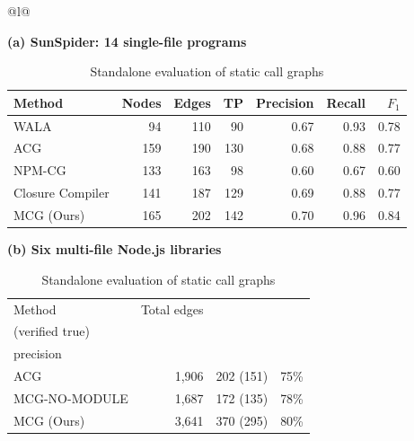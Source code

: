 \begin{table}[!htbp]
\centering
\caption{Standalone evaluation of static call graphs}
\label{tab:mcg_static}
\small
\setlength{\tabcolsep}{4.3pt}
\renewcommand{\arraystretch}{1.10}
\begin{tabular*}{\linewidth}{@{}l@{}}
\begin{minipage}{\linewidth}
\textbf{(a) SunSpider: 14 single-file programs}\par\smallskip
\begin{tabular*}{1.0\linewidth}{@{\extracolsep{\fill}}lrrrrrr@{}}
\toprule
Method & Nodes & Edges & TP & Precision & Recall & $F_1$ \\
\midrule
WALA & 94 & 110 & 90 & 0.67 & 0.93 & 0.78 \\
ACG & 159 & 190 & 130 & 0.68 & 0.88 & 0.77 \\
NPM-CG & 133 & 163 & 98 & 0.60 & 0.67 & 0.60 \\
Closure Compiler & 141 & 187 & 129 & 0.69 & 0.88 & 0.77 \\
MCG (Ours) & 165 & 202 & 142 & 0.70 & 0.96 & 0.84 \\
\bottomrule
\end{tabular*}\par\medskip
\textbf{(b) Six multi-file Node.js libraries}\par\smallskip
\begin{tabular*}{1.0\linewidth}{@{\extracolsep{\fill}}lrrr@{}}
\toprule
Method & Total edges & \makecell[r]{Sampled edges\\(verified true)} & \makecell[r]{Sampled\\precision} \\
\midrule
ACG & 1,906 & 202 (151) & 75\% \\
MCG-NO-MODULE & 1,687 & 172 (135) & 78\% \\
MCG (Ours) & 3,641 & 370 (295) & 80\% \\
\bottomrule
\end{tabular*}
\end{minipage}\\
\end{tabular*}
\end{table}

